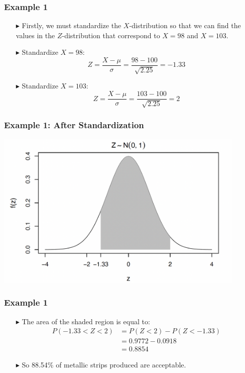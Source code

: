 \documentclass[12pt]{beamer}
\begin{document}
\begin{frame}
	\frametitle{Example 1}
	
	\begin{itemize}
		\item[\color{blue}$\blacktriangleright$] Firstly, we must standardize the $X$-distribution so 
		that we can find the values in the $Z$-distribution 
		that correspond to $X = 98$ and $X = 103$.
		
		\item[\color{blue}$\blacktriangleright$] Standardize $X = 98$:
		\[
		Z = \frac{X - \mu}{\sigma} = \frac{98 - 100}{\sqrt{2.25}} = -1.33
		\]
		
		\item[\color{blue}$\blacktriangleright$] Standardize $X = 103$:
		\[
		Z = \frac{X - \mu}{\sigma} = \frac{103 - 100}{\sqrt{2.25}} = 2
		\]
	\end{itemize}
	
	\end{frame}
	\begin{frame}
	\frametitle{Example 1: After Standardization}
	\centering
	\includegraphics[width=12cm]{normal9.png}
\end{frame}
\begin{frame}
	\frametitle{Example 1}
	
	\begin{itemize}
		\item[\color{blue}$\blacktriangleright$] The area of the shaded region is equal to:
		\begin{align*}
			P(-1.33 < Z < 2) &= P(Z < 2) - P(Z < -1.33) \\
			&= 0.9772 - 0.0918 \\
			&= 0.8854
		\end{align*}
		
		\item[\color{blue}$\blacktriangleright$] So 88.54\% of metallic strips produced are 
		acceptable.
	\end{itemize}
	
\end{frame}
\end{document}
